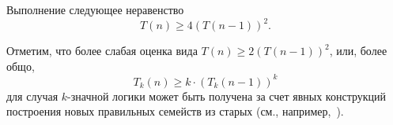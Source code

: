     \begin{corollary}
    \label{uso:lowerbound}
        Выполнение следующее неравенство 
        \[
            T(n) \ge 4 \left( T(n-1) \right)^2.
        \]
    \end{corollary}
    Отметим, что более слабая оценка вида $T(n) \ge 2 \left( T(n-1) \right)^2$, или, более общо, 
    \[
        T_k(n) \ge k \cdot \left( T_k(n-1) \right)^k
    \] 
    для случая $k$-значной логики может быть получена за счет явных конструкций построения новых правильных семейств из старых (см., например,~\cite[теорема~2]{galatenko20algo}).





